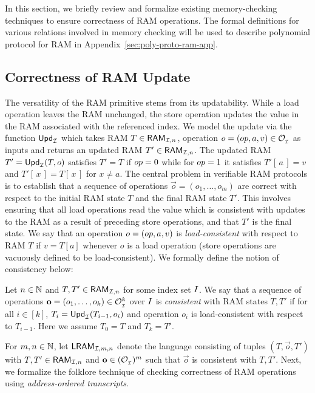 In this section, we briefly review and formalize existing memory-checking techniques to ensure
correctness of RAM operations. The formal definitions for various relations involved in memory checking
will be used to describe polynomial protocol for RAM in Appendix~\ref{sec:poly-proto-ram-app}.

\subsection{Correctness of RAM Update}\label{subsec:ram-update}
The versatility of the RAM primitive stems from its updatability. While a load operation leaves the RAM unchanged, the store operation
updates the value in the RAM associated with the referenced index. We model the update via the function
$\mathsf{Upd}_{\mathcal{I}}$ which takes RAM $T\in \mathsf{RAM}_{\mathcal{I}, {n}}$, operation
$o=({op},a,v)\in \mathcal{O}_{{}_\mathcal{I}}$ as inputs and returns an updated RAM $T'\in \mathsf{RAM}_{\mathcal{I}, {n}}$.
The updated RAM $T'=\mathsf{Upd}_{\mathcal{I}}(T,o)$ satisfies
$T'=T$ if ${op}=0$ while for ${op}=1$ it satisfies $T'[\,a\,]=v$  and $T'[\,x\,]=T[\,x\,]$ for $x\neq a$. The central problem
in verifiable RAM protocols is to establish that a sequence of operations $\vec{o}=(o_1,\ldots,o_m)$ are correct with
respect to the initial RAM state $T$ and the final RAM state $T'$. This involves ensuring
that all load operations read the value which is consistent with updates to the RAM as a result of preceding
store operations, and that $T'$ is the final state. We say that an operation $o=({op},a,v)$ is {\em load-consistent}
with respect to RAM $T$ if $v=T[a]$ whenever $o$ is a load operation (store operations are vacuously defined to be load-consistent).
We formally define the notion of consistency below:

\begin{definition}\label{defn:consistent-operations}
    Let $n\in \mathbb{N}$ and $T,T'\in \mathsf{RAM}_{\mathcal{I}, {n}}$ for some index set $I$. We say that a sequence of operations
    $\mathbf{o}=(o_1,\ldots,o_k)\in \mathcal{O}_{{}_\mathcal{I}}^k$ over $I$ is {\em consistent} with RAM states
    $T,T'$ if for all $i\in [k]$, $T_{i}=\mathsf{Upd}_{\mathcal{I}}(T_{i-1},o_i)$ and operation $o_i$ is load-consistent with respect to $T_{i-1}$. Here
    we assume $T_0=T$ and $T_k=T'$.
\end{definition}

For $m,n\in \mathbb{N}$, let $\mathsf{LRAM}_{\mathcal{I},m,n}$ denote the language consisting of tuples $(T,\vec{o},T')$ with $T,T'\in \mathsf{RAM}_{\mathcal{I}, {n}}$ and $\mathbf{o}\in (\mathcal{O}_{{}_\mathcal{I}})^m$
such that $\vec{o}$ is consistent with $T,T'$.
Next, we formalize the folklore technique of checking correctness of RAM operations
using {\em address-ordered transcripts}.

